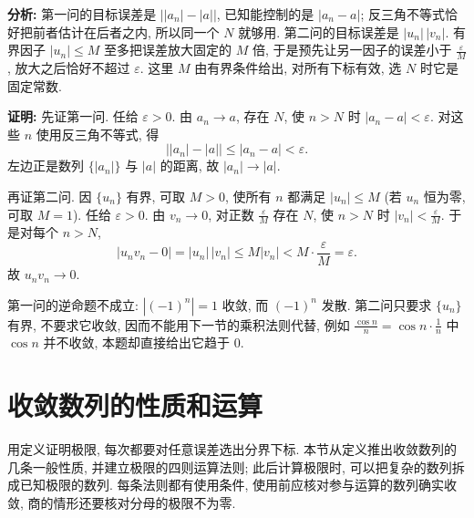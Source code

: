 \documentclass[UTF8,openany]{ctexbook}
\theoremstyle{chinesetextbook}
\newenvironment{cnproof}{\par\indent\textbf{证明:} \ignorespaces}{\par}
\begin{document}
\par\indent\textbf{分析:} 第一问的目标误差是 $\bigl||a_n|-|a|\bigr|$, 已知能控制的是 $|a_n-a|$; 反三角不等式恰好把前者估计在后者之内, 所以同一个 $N$ 就够用. 第二问的目标误差是 $|u_n|\,|v_n|$. 有界因子 $|u_n|\le M$ 至多把误差放大固定的 $M$ 倍, 于是预先让另一因子的误差小于 $\displaystyle\frac\varepsilon M$, 放大之后恰好不超过 $\varepsilon$. 这里 $M$ 由有界条件给出, 对所有下标有效, 选 $N$ 时它是固定常数.
\begin{cnproof}
先证第一问. 任给 $\varepsilon>0$. 由 $a_n\to a$, 存在 $N$, 使 $n>N$ 时 $|a_n-a|<\varepsilon$. 对这些 $n$ 使用反三角不等式, 得
\[
\bigl||a_n|-|a|\bigr|\le|a_n-a|<\varepsilon.
\]
左边正是数列 $\{|a_n|\}$ 与 $|a|$ 的距离, 故 $|a_n|\to|a|$.

再证第二问. 因 $\{u_n\}$ 有界, 可取 $M>0$, 使所有 $n$ 都满足 $|u_n|\le M$ (若 $u_n$ 恒为零, 可取 $M=1$). 任给 $\varepsilon>0$. 由 $v_n\to0$, 对正数 $\displaystyle\frac\varepsilon M$ 存在 $N$, 使 $n>N$ 时 $\displaystyle|v_n|<\frac\varepsilon M$. 于是对每个 $n>N$,
\[
|u_nv_n-0|=|u_n|\,|v_n|\le M|v_n|<M\cdot\frac\varepsilon M=\varepsilon.
\]
故 $u_nv_n\to0$.
\end{cnproof}
第一问的逆命题不成立: $|(-1)^n|=1$ 收敛, 而 $(-1)^n$ 发散. 第二问只要求 $\{u_n\}$ 有界, 不要求它收敛, 因而不能用下一节的乘积法则代替, 例如 $\displaystyle\frac{\cos n}n=\cos n\cdot\frac1n$ 中 $\cos n$ 并不收敛, 本题却直接给出它趋于 $0$.
\section{收敛数列的性质和运算}
用定义证明极限, 每次都要对任意误差选出分界下标. 本节从定义推出收敛数列的几条一般性质, 并建立极限的四则运算法则; 此后计算极限时, 可以把复杂的数列拆成已知极限的数列. 每条法则都有使用条件, 使用前应核对参与运算的数列确实收敛, 商的情形还要核对分母的极限不为零.
\end{document}
